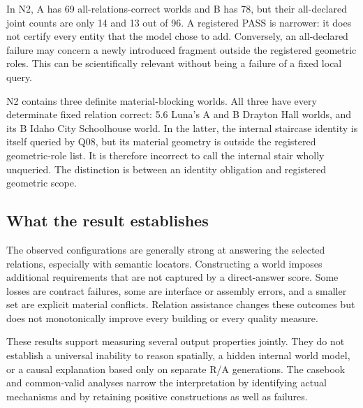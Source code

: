 \begin{table}[htbp]\centering\small

\caption{World-level results, out of allocated A/B worlds. Reg./Decl. are geometry PASS counts; joint also requires complete determinate correctness and coverage. Block means a definite represented material obstruction, a narrower class than all geometric violations.}\label{tab:E-world}
\end{table}

In N2, A has 69 all-relations-correct worlds and B has 78, but their all-declared joint counts are only 14 and 13 out of 96. A registered PASS is narrower: it does not certify every entity that the model chose to add. Conversely, an all-declared failure may concern a newly introduced fragment outside the registered geometric roles. This can be scientifically relevant without being a failure of a fixed local query.

N2 contains three definite material-blocking worlds. All three have every determinate fixed relation correct: 5.6 Luna's A and B Drayton Hall worlds, and its B Idaho City Schoolhouse world. In the latter, the internal staircase identity is itself queried by Q08, but its material geometry is outside the registered geometric-role list. It is therefore incorrect to call the internal stair wholly unqueried. The distinction is between an identity obligation and registered geometric scope.

\subsection{What the result establishes}
The observed configurations are generally strong at answering the selected relations, especially with semantic locators. Constructing a world imposes additional requirements that are not captured by a direct-answer score. Some losses are contract failures, some are interface or assembly errors, and a smaller set are explicit material conflicts. Relation assistance changes these outcomes but does not monotonically improve every building or every quality measure.

These results support measuring several output properties jointly. They do not establish a universal inability to reason spatially, a hidden internal world model, or a causal explanation based only on separate R/A generations. The casebook and common-valid analyses narrow the interpretation by identifying actual mechanisms and by retaining positive constructions as well as failures.
